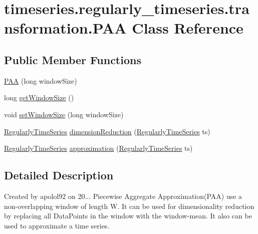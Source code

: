 \hypertarget{classtimeseries_1_1regularly__timeseries_1_1transformation_1_1_p_a_a}{}\section{timeseries.\+regularly\+\_\+timeseries.\+transformation.\+P\+A\+A Class Reference}
\label{classtimeseries_1_1regularly__timeseries_1_1transformation_1_1_p_a_a}
\subsection*{Public Member Functions}
\begin{DoxyCompactItemize}
\item 
\hyperlink{classtimeseries_1_1regularly__timeseries_1_1transformation_1_1_p_a_a_a1932514163d1c6e24e9b4bd38f6a587c}{P\+A\+A} (long window\+Size)
\item 
long \hyperlink{classtimeseries_1_1regularly__timeseries_1_1transformation_1_1_p_a_a_adca83f98f64a2c0006d683e0a733612b}{get\+Window\+Size} ()
\item 
void \hyperlink{classtimeseries_1_1regularly__timeseries_1_1transformation_1_1_p_a_a_adb985da9df6fb94324643afc2797f49b}{set\+Window\+Size} (long window\+Size)
\item 
\hyperlink{classtimeseries_1_1_regularly_time_series}{Regularly\+Time\+Series} \hyperlink{classtimeseries_1_1regularly__timeseries_1_1transformation_1_1_p_a_a_ac43ad5fe7ce6d8837fbd2c6647ac6a1c}{dimension\+Reduction} (\hyperlink{classtimeseries_1_1_regularly_time_series}{Regularly\+Time\+Series} ts)
\item 
\hyperlink{classtimeseries_1_1_regularly_time_series}{Regularly\+Time\+Series} \hyperlink{classtimeseries_1_1regularly__timeseries_1_1transformation_1_1_p_a_a_a3746512b4df95795b7a13d98b01fd814}{approximation} (\hyperlink{classtimeseries_1_1_regularly_time_series}{Regularly\+Time\+Series} ts)
\end{DoxyCompactItemize}


\subsection{Detailed Description}
Created by apolol92 on 20... Piecewise Aggregate Approximation(\+P\+A\+A) use a non-\/overlapping window of length W. It can be used for dimensionality reduction by replacing all Data\+Points in the window with the window-\/mean. It also can be used to approximate a time series. 

